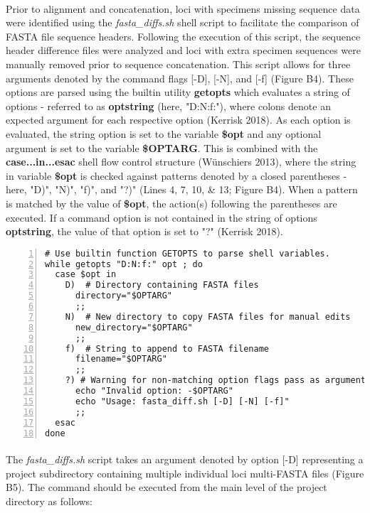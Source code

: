\paragraph{} Prior to alignment and concatenation, loci with specimens missing sequence data were identified using the \textit{fasta\_diffs.sh} shell script to facilitate the comparison of FASTA file sequence headers.  Following the execution of this script, the sequence header difference files were analyzed and loci with extra specimen sequences were manually removed prior to sequence concatenation.  This script allows for three arguments denoted by the command flags [-D], [-N], and [-f] (Figure B4).  These options are parsed using the builtin utility \textbf{getopts} which evaluates a string of options - referred to as \textbf{optstring} (here, "D:N:f:"), where colons denote an expected argument for each respective option (Kerrisk 2018).  As each option is evaluated, the string option is set to the variable \textbf{\$opt} and any optional argument is set to the variable \textbf{\$OPTARG}.  This is combined with the \textbf{case...in...esac} shell flow control structure (Wünschiers 2013), where the string in variable \textbf{\$opt} is checked against patterns denoted by a closed parentheses - here, "D)", "N)", "f)", and "?)" (Lines 4, 7, 10, \& 13; Figure B4).  When a pattern is matched by the value of \textbf{\$opt}, the action(s) following the parentheses are executed.  If a command option is not contained in the string of options \textbf{optstring}, the value of that option is set to "?" (Kerrisk 2018).

\clearpage

\begin{lstlisting}[numbers=left, showstringspaces=false, caption={Use of GETOPTS to parse script options.}]
# Use builtin function GETOPTS to parse shell variables.
while getopts "D:N:f:" opt ; do
  case $opt in
    D)  # Directory containing FASTA files
      directory="$OPTARG"
      ;;
    N)  # New directory to copy FASTA files for manual edits
      new_directory="$OPTARG"
      ;;
    f)  # String to append to FASTA filename
      filename="$OPTARG"
      ;;
    ?) # Warning for non-matching option flags pass as arguments
      echo "Invalid option: -$OPTARG"
      echo "Usage: fasta_diff.sh [-D] [-N] [-f]"
      ;;
  esac
done
\end{lstlisting}

\vspace*{36pt}

\paragraph{} The \textit{fasta\_diffs.sh} script takes an argument denoted by option [-D] representing a project subdirectory containing multiple individual loci multi-FASTA files (Figure B5).  The command should be executed from the main level of the project directory as follows:

